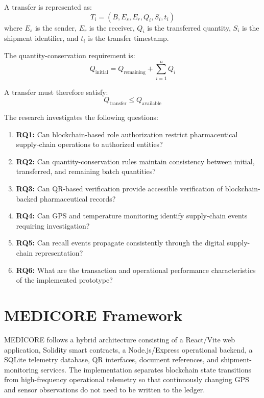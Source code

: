 \documentclass[11pt,a4paper]{article}
\begin{document}
A transfer is represented as:
\begin{equation}
T_i = (B, E_s, E_r, Q_i, S_i, t_i)
\end{equation}
where $E_s$ is the sender, $E_r$ is the receiver, $Q_i$ is the transferred quantity, $S_i$ is the shipment identifier, and $t_i$ is the transfer timestamp.

The quantity-conservation requirement is:
\begin{equation}
Q_{\text{initial}} = Q_{\text{remaining}} + \sum_{i=1}^n Q_i
\end{equation}

A transfer must therefore satisfy:
\begin{equation}
Q_{\text{transfer}} \le Q_{\text{available}}
\end{equation}

The research investigates the following questions:
\begin{enumerate}
    \item \textbf{RQ1:} Can blockchain-based role authorization restrict pharmaceutical supply-chain operations to authorized entities?
    \item \textbf{RQ2:} Can quantity-conservation rules maintain consistency between initial, transferred, and remaining batch quantities?
    \item \textbf{RQ3:} Can QR-based verification provide accessible verification of blockchain-backed pharmaceutical records?
    \item \textbf{RQ4:} Can GPS and temperature monitoring identify supply-chain events requiring investigation?
    \item \textbf{RQ5:} Can recall events propagate consistently through the digital supply-chain representation?
    \item \textbf{RQ6:} What are the transaction and operational performance characteristics of the implemented prototype?
\end{enumerate}

\section{MEDICORE Framework}
MEDICORE follows a hybrid architecture consisting of a React/Vite web application, Solidity smart contracts, a Node.js/Express operational backend, a SQLite telemetry database, QR interfaces, document references, and shipment-monitoring services. The implementation separates blockchain state transitions from high-frequency operational telemetry so that continuously changing GPS and sensor observations do not need to be written to the ledger.
\end{document}
